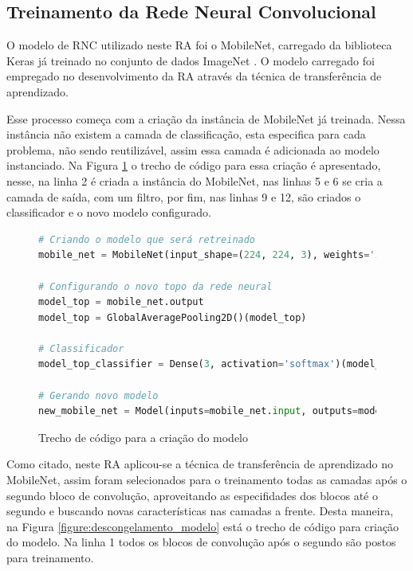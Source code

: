 
\subsection{Treinamento da Rede Neural Convolucional}

\par O modelo de RNC utilizado neste RA foi o MobileNet, carregado da biblioteca Keras já treinado no conjunto de dados ImageNet \cite{Russakovsky2015}. O modelo carregado foi empregado no desenvolvimento da RA através da técnica de transferência de aprendizado.

\par Esse processo começa com a criação da instância de MobileNet já treinada. Nessa instância não existem a camada de classificação, esta especifica para cada problema, não sendo reutilizável, assim essa camada é adicionada ao modelo instanciado. Na Figura \ref{figure:criacao_do_modelo} o trecho de código para essa criação é apresentado, nesse, na linha 2 é criada a instância do MobileNet, nas linhas 5 e 6 se cria a camada de saída, com um filtro, por fim, nas linhas 9 e 12, são criados o classificador e o novo modelo configurado.

\begin{figure}[H]
    \centering
    \caption{Trecho de código para a criação do modelo}
    \begin{lstlisting}[language=Python]
# Criando o modelo que será retreinado
mobile_net = MobileNet(input_shape=(224, 224, 3), weights='imagenet', include_top=False)

# Configurando o novo topo da rede neural
model_top = mobile_net.output
model_top = GlobalAveragePooling2D()(model_top)

# Classificador
model_top_classifier = Dense(3, activation='softmax')(model_top)

# Gerando novo modelo
new_mobile_net = Model(inputs=mobile_net.input, outputs=model_top_classifier)
    \end{lstlisting}
    \label{figure:criacao_do_modelo}
\end{figure}

\par Como citado, neste RA aplicou-se a técnica de transferência de aprendizado no MobileNet, assim foram selecionados para o treinamento todas as camadas após o segundo bloco de convolução, aproveitando as especifidades dos blocos até o segundo e buscando novas características nas camadas a frente. Desta maneira, na Figura \ref{figure:descongelamento_modelo} está o trecho de código para criação do modelo. Na linha 1 todos os blocos de convolução após o segundo são postos para treinamento.

